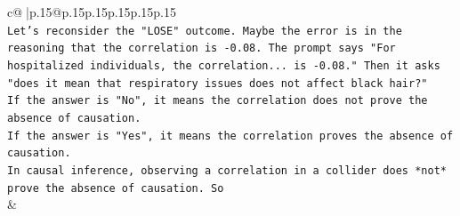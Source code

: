 \documentclass{article}
\begin{document}
{\begin{supertabular}{c@{$\;$}|p{.15\linewidth}@{}p{.15\linewidth}p{.15\linewidth}p{.15\linewidth}p{.15\linewidth}p{.15\linewidth}}
{{{\\ 
\texttt{Let's reconsider the "LOSE" outcome. Maybe the error is in the reasoning that the correlation is {-}0.08. The prompt says "For hospitalized individuals, the correlation... is {-}0.08." Then it asks "does it mean that respiratory issues does not affect black hair?"} \\
\texttt{If the answer is "No", it means the correlation does not prove the absence of causation.} \\
\texttt{If the answer is "Yes", it means the correlation proves the absence of causation.} \\
\texttt{In causal inference, observing a correlation in a collider does *not* prove the absence of causation. So} \\
            }
        }
    }
    & \\ \\

\end{supertabular}
}
\end{document}
